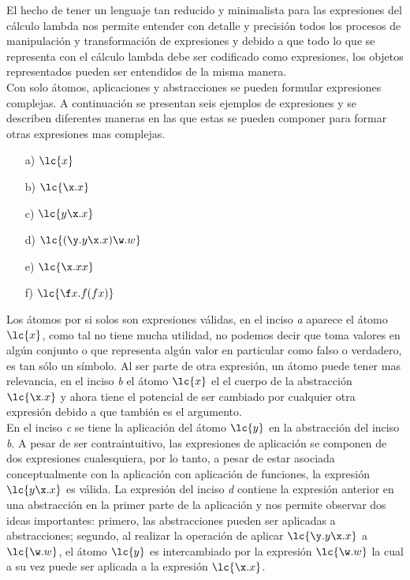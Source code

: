 El hecho de tener un lenguaje tan reducido y minimalista para las expresiones
del cálculo lambda nos permite entender con detalle y precisión todos los
procesos de manipulación y transformación de expresiones y debido a que todo lo
que se representa con el cálculo lambda debe ser codificado como expresiones,
los objetos representados pueden ser entendidos de la misma manera. \\

Con solo átomos, aplicaciones y abstracciones se pueden formular expresiones
complejas. A continuación se presentan seis ejemplos de expresiones y se
describen diferentes maneras en las que estas se pueden componer para formar
otras expresiones mas complejas. \\

\begin{itemize}
\item[a)] \(\lc{x}\)
\item[b)] \(\lc{\x.x}\)
\item[c)] \(\lc{y\x.x}\)
\item[d)] \(\lc{(\y.y\x.x)\w.w}\)
\item[e)] \(\lc{\x.x x}\)
\item[f)] \(\lc{\f x.f(f x)}\)
\end{itemize}

Los átomos por si solos son expresiones válidas, en el inciso \emph{a} aparece
el átomo \(\lc{x}\), como tal no tiene mucha utilidad, no podemos decir que toma
valores en algún conjunto o que representa algún valor en particular como falso
o verdadero, es tan sólo un símbolo. Al ser parte de otra expresión, un átomo
puede tener mas relevancia, en el inciso \emph{b} el átomo \(\lc{x}\) el el
cuerpo de la abstracción \(\lc{\x.x}\) y ahora tiene el potencial de ser
cambiado por cualquier otra expresión debido a que también es el argumento. \\

En el inciso \emph{c} se tiene la aplicación del átomo \(\lc{y}\) en la
abstracción del inciso \emph{b}. A pesar de ser contraintuitivo, las expresiones
de aplicación se componen de dos expresiones cualesquiera, por lo tanto, a pesar
de estar asociada conceptualmente con la aplicación con aplicación de funciones,
la expresión \(\lc{y\x.x}\) es válida. La expresión del inciso \emph{d} contiene
la expresión anterior en una abstracción en la primer parte de la aplicación y
nos permite observar dos ideas importantes: primero, las abstracciones pueden ser
aplicadas a abstracciones; segundo, al realizar la operación de aplicar
\(\lc{\y.y\x.x}\) a \(\lc{\w.w}\), el átomo \(\lc{y}\) es intercambiado por la
expresión \(\lc{\w.w}\) la cual a su vez puede ser aplicada a la expresión
\(\lc{\x.x}\). \\


